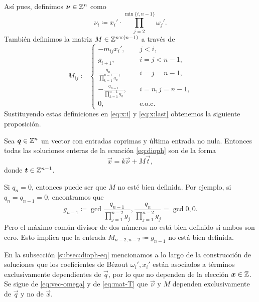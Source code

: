 Así pues, definimos $\boldsymbol{\nu} \in \mathbb{Z}^n$ como
\begin{equation}
	\label{eq:vec-omega}
	\nu_i \coloneq x_i' \cdot \prod_{j = 2}^{\min{\lbrace i, n - 1 \rbrace}}\omega_j'.
\end{equation}
También definimos la matriz $M \in \mathbb{Z}^{n \times (n - 1)}$ a través de
\begin{equation}
	\label{eq:mat-T}
	M_{ij} \coloneq \begin{cases}
		-m_{ij}x_i', &\quad j < i, \\
		g_{i + 1},  &\quad i = j < n - 1, \\
		\frac{q_n}{\prod_{k=1}^{n-1}g_k}, &\quad i = j = n - 1, \\
		-\frac{q_{n-1}}{\prod_{k=1}^{n-1}g_k}, &\quad i = n, j = n - 1, \\
		0, &\quad \text{e.o.c.}
	\end{cases}
\end{equation}
Sustituyendo estas definiciones en \eqref{eq:x:i} y \eqref{eq:x:last} obtenemos la siguiente
proposición.
\begin{prop}
	\label{prop:xint}
	Sea $\boldsymbol{q} \in \mathbb{Z}^n$ un vector con entradas coprimas y última entrada no nula. Entonces todas
	las soluciones enteras de la ecuación \eqref{eq:dioph} son de la forma
	\begin{equation}
		\label{eq:transf}
		\vec{x} = k\vec{\nu} + M\vec{t},
	\end{equation}
	donde $\boldsymbol{t} \in \mathbb{Z}^{n-1}$.
\end{prop}

\begin{observation}
	Si $q_n = 0$, entonces puede ser que $M$ no esté bien definida. Por ejemplo, si
	$q_n = q_{n-1} = 0$, encontramos que
	\begin{equation*}
		g_{n-1} \coloneq \gcd{\frac{q_{n-1}}{\prod_{j=1}^{n-2}g_j},
		\frac{q_n}{\prod_{j=1}^{n-2}g_j}} = \gcd{0, 0}.
	\end{equation*}
	Pero el máximo común divisor de dos números no está bien definido si ambos
	son cero. Esto implica que la entrada $M_{n-2, n-2} \coloneq g_{n-1}$ no
	está bien definida.
\end{observation}

En la subsección \ref{subsec:dioph-eq} mencionamos a lo largo de la construcción de soluciones que
los coeficientes de Bézout $\omega_i', x_i'$ están asociados a términos exclusivamente dependientes
de $\vec{q}$, por lo que no dependen de la elección $\boldsymbol{x} \in \mathbb{Z}$. Se sigue de
\eqref{eq:vec-omega} y de \eqref{eq:mat-T} que $\vec{\nu}$ y $M$ dependen exclusivamente de
$\vec{q}$ y no de $\vec{x}$.

